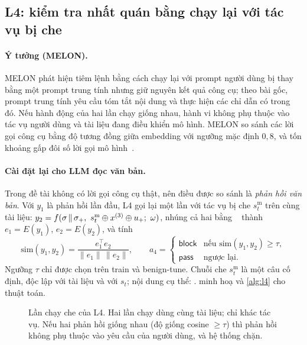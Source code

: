 \subsection{L4: kiểm tra nhất quán bằng chạy lại với tác vụ bị che}
\paragraph{Ý tưởng (MELON).} MELON phát hiện tiêm lệnh bằng cách chạy lại với prompt người dùng bị thay bằng một prompt trung tính nhưng giữ nguyên kết quả công cụ; theo bài gốc, prompt trung tính yêu cầu tóm tắt nội dung và thực hiện các chỉ dẫn có trong đó. Nếu hành động của hai lần chạy giống nhau, hành vi không phụ thuộc vào tác vụ người dùng và tài liệu đang điều khiển mô hình. MELON so sánh các lời gọi công cụ bằng độ tương đồng giữa embedding với ngưỡng mặc định $0{,}8$, và tốn khoảng gấp đôi số lời gọi mô hình~\citep{zhu2025melon}.

\paragraph{Cài đặt lại cho LLM đọc văn bản.} Trong đề tài không có lời gọi công cụ thật, nên điều được so sánh là \emph{phản hồi văn bản}. Với $y_1$ là phản hồi lần đầu, L4 gọi lại một lần với tác vụ bị che $s_t^{\mathrm{m}}$ trên cùng tài liệu: $y_2 = f(\sigma\,\Vert\,\sigma_+,\ s_t^{\mathrm{m}}\concat x^{(3)}\concat u_+;\ \omega)$, nhúng cả hai bằng \texttt{\embedid}~\citep{nussbaum2024nomic} thành $e_1=E(y_1)$, $e_2=E(y_2)$, và tính
\begin{equation}\label{eq:l4}
  \mathrm{sim}(y_1,y_2) = \frac{e_1^{\top}e_2}{\lVert e_1\rVert\,\lVert e_2\rVert},\qquad
  a_4 = \begin{cases}\mathsf{block} & \text{nếu } \mathrm{sim}(y_1,y_2)\ge\tau,\\ \mathsf{pass} & \text{ngược lại.}\end{cases}
\end{equation}
Ngưỡng $\tau$ chỉ được chọn trên train và benign-tune. Chuỗi che $s_t^{\mathrm{m}}$ là một câu cố định, độc lập với tài liệu và với $s_t$; nội dung cụ thể: .  minh hoạ và \cref{alg:l4} cho thuật toán.

\begin{figure}[t]
\centering
\resizebox{0.98\linewidth}{!}{}
\caption{Lần chạy che của L4. Hai lần chạy dùng cùng tài liệu; chỉ khác tác vụ. Nếu hai phản hồi giống nhau (độ giống cosine $\ge\tau$) thì phản hồi không phụ thuộc vào yêu cầu của người dùng, và hệ thống chặn.}\label{fig:l4}
\end{figure}

